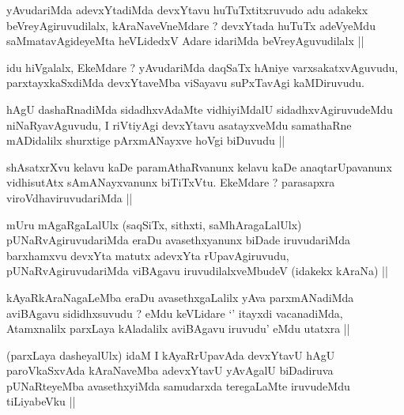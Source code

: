 

\begin{artha}
yAvudariMda adevxYtadiMda devxYtavu huTuTxtitxruvudo adu adakekx beVreyAgiruvudilalx, kAraNaveVneMdare ? devxYtada huTuTx adeVyeMdu saMmatavAgideyeMta heVLidedxV Adare idariMda beVreyAguvudilalx ||
\end{artha}


\begin{artha}
idu hiVgalalx, EkeMdare ? yAvudariMda daqSaTx hAniye varxsakatxvAguvudu, parxtayxkaSxdiMda devxYtaveMba viSayavu suPxTavAgi kaMDiruvudu.
\end{artha}

\begin{artha}
hAgU dashaRnadiMda sidadhxvAdaMte vidhiyiMdalU sidadhxvAgiruvudeMdu niNaRyavAguvudu, I riVtiyAgi devxYtavu asatayxveMdu samathaRne mADidalilx shurxtige pArxmANayxve hoVgi biDuvudu ||
\end{artha}


\begin{artha}
shAsatxrXvu kelavu kaDe paramAthaRvanunx kelavu kaDe anaqtarUpavanunx vidhisutAtx sAmANayxvanunx biTiTxVtu. EkeMdare ? parasapxra viroVdhaviruvudariMda ||
\end{artha}

\begin{artha}
mUru mAgaRgaLalUlx (saqSiTx, sithxti, saMhAragaLalUlx) pUNaRvAgiruvudariMda eraDu avasethxyanunx biDade iruvudariMda barxhamxvu devxYta matutx adevxYta rUpavAgiruvudu, pUNaRvAgiruvudariMda viBAgavu iruvudilalxveMbudeV (idakekx kAraNa) ||
\end{artha}

\begin{artha}
kAyaRkAraNagaLeMba eraDu avasethxgaLalilx yAva parxmANadiMda aviBAgavu sididhxsuvudu ? eMdu keVLidare `\stext' itayxdi vacanadiMda, Atamxnalilx parxLaya kAladalilx aviBAgavu iruvudu' eMdu utatxra ||
\end{artha}

\begin{artha}
(parxLaya dasheyalUlx) idaM I kAyaRrUpavAda devxYtavU hAgU paroVkaSxvAda kAraNaveMba adevxYtavU yAvAgalU biDadiruva pUNaRteyeMba avasethxyiMda samudarxda teregaLaMte iruvudeMdu tiLiyabeVku ||
\end{artha}

